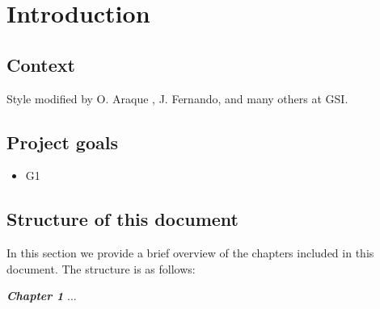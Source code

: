 \chapter{Introduction}
\label{chap:introduction}

\section{Context}
\label{sec:context}

Style modified by O. Araque \cite{oaraque}, J. Fernando\cite{jfernando}, and many others at GSI.

\section{Project goals}
\label{sec:project-goals}


\begin{itemize}


\item  G1

\end{itemize}

\section{Structure of this document}
\label{sec:structure-of-document}

In this section we provide a brief overview of the chapters included in this document. The structure is as follows:

\textbf{\textit{Chapter 1}} ...
